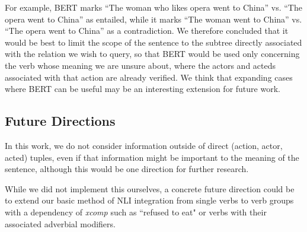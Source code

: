 \documentclass{article}
\begin{document}
For example, BERT marks
``The woman who likes opera went to China'' vs. ``The opera went to China'' as entailed, while it marks ``The woman went to China'' vs. ``The opera went to China'' as a contradiction. We therefore concluded that it would be best to limit the scope of the sentence to the subtree directly associated with the relation we wish to query, so that BERT would be used only concerning the verb whose meaning we are unsure about, where the actors and acteds associated with that action are already verified. We think that expanding cases where BERT can be useful may be an interesting extension for future work.





\subsection{Future Directions}
In this work, we do not consider information outside of direct (action, actor, acted) tuples, even if that information might be important to the meaning of the sentence, although this would be one direction for further research. 

While we did not implement this ourselves, a concrete future direction could be to extend our basic method of NLI integration from single verbs to verb groups with a dependency of \textit{xcomp} such as ``refused to eat" or verbs with their associated adverbial modifiers.
\end{document}
